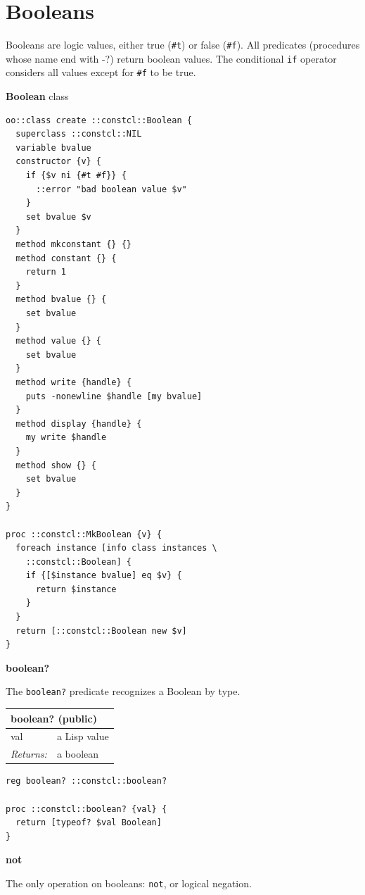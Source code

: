 \documentclass[twoside,9pt]{report}
\begin{document}
\section{Booleans}
\label{booleans}

Booleans are logic values, either true (\texttt{\#t}) or false (\texttt{\#f}). All predicates (procedures whose name end with -?) return boolean values. The conditional \texttt{if} operator considers all values except for \texttt{\#f} to be true.


\textbf{Boolean} class

\noindent\makebox[\linewidth]{\rule{\linewidth}{0.4pt}}
\begin{lstlisting}
oo::class create ::constcl::Boolean {
  superclass ::constcl::NIL
  variable bvalue
  constructor {v} {
    if {$v ni {#t #f}} {
      ::error "bad boolean value $v"
    }
    set bvalue $v
  }
  method mkconstant {} {}
  method constant {} {
    return 1
  }
  method bvalue {} {
    set bvalue
  }
  method value {} {
    set bvalue
  }
  method write {handle} {
    puts -nonewline $handle [my bvalue]
  }
  method display {handle} {
    my write $handle
  }
  method show {} {
    set bvalue
  }
}
 
proc ::constcl::MkBoolean {v} {
  foreach instance [info class instances \
    ::constcl::Boolean] {
    if {[$instance bvalue] eq $v} {
      return $instance
    }
  }
  return [::constcl::Boolean new $v]
}
\end{lstlisting}
\noindent\makebox[\linewidth]{\rule{\linewidth}{0.4pt}}

\textbf{boolean?}


The \texttt{boolean?} predicate recognizes a Boolean by type.

\begin{tabular}{ |l l| }
\hline
\multicolumn{2}{|l|}{boolean? (public)} \\
\hline
val & a Lisp value \\
\textit{Returns:} & a boolean \\
\hline
\end{tabular}

\noindent\makebox[\linewidth]{\rule{\linewidth}{0.4pt}}
\begin{lstlisting}
reg boolean? ::constcl::boolean?
 
proc ::constcl::boolean? {val} {
  return [typeof? $val Boolean]
}
\end{lstlisting}
\noindent\makebox[\linewidth]{\rule{\linewidth}{0.4pt}}

\textbf{not}


The only operation on booleans: \texttt{not}, or logical negation.
\end{document}
